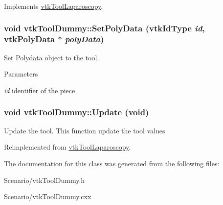 Implements \hyperlink{classvtkToolLaparoscopy_ace75ea21a3ddb27547976ddea0ebb60e}{vtkToolLaparoscopy}.\hypertarget{classvtkToolDummy_a3170be76c18a7507cb6014fc49123919}{
\subsubsection[{SetPolyData}]{\setlength{\rightskip}{0pt plus 5cm}void vtkToolDummy::SetPolyData (vtkIdType {\em id}, \/  vtkPolyData $\ast$ {\em polyData})}}
\label{classvtkToolDummy_a3170be76c18a7507cb6014fc49123919}
Set Polydata object to the tool. 
\begin{DoxyParams}{Parameters}
\item[{\em id}]identifier of the piece \end{DoxyParams}
\hypertarget{classvtkToolDummy_a19cda726ffda0a3955e519d7b42e4882}{
\subsubsection[{Update}]{\setlength{\rightskip}{0pt plus 5cm}void vtkToolDummy::Update (void)}}
\label{classvtkToolDummy_a19cda726ffda0a3955e519d7b42e4882}


Update the tool. This function update the tool values 

Reimplemented from \hyperlink{classvtkToolLaparoscopy_a4445a0cfabd77b50a06929b04cb71f9e}{vtkToolLaparoscopy}.

The documentation for this class was generated from the following files:\begin{DoxyCompactItemize}
\item 
Scenario/vtkToolDummy.h\item 
Scenario/vtkToolDummy.cxx\end{DoxyCompactItemize}
